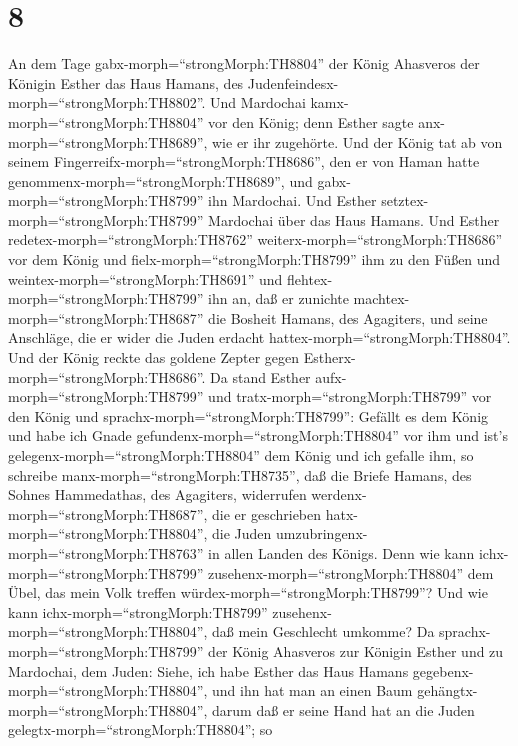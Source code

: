 \hypertarget{section-7}{%
\section{8}\label{section-7}}

 An dem Tage gabx-morph=``strongMorph:TH8804'' der König
Ahasveros der Königin Esther das Haus Hamans, des
Judenfeindesx-morph=``strongMorph:TH8802''. Und Mardochai
kamx-morph=``strongMorph:TH8804'' vor den König; denn Esther sagte
anx-morph=``strongMorph:TH8689'', wie er ihr zugehörte.  Und
der König tat ab von seinem Fingerreifx-morph=``strongMorph:TH8686'',
den er von Haman hatte genommenx-morph=``strongMorph:TH8689'', und
gabx-morph=``strongMorph:TH8799'' ihn Mardochai. Und Esther
setztex-morph=``strongMorph:TH8799'' Mardochai über das Haus Hamans.
 Und Esther redetex-morph=``strongMorph:TH8762''
weiterx-morph=``strongMorph:TH8686'' vor dem König und
fielx-morph=``strongMorph:TH8799'' ihm zu den Füßen und
weintex-morph=``strongMorph:TH8691'' und
flehtex-morph=``strongMorph:TH8799'' ihn an, daß er zunichte
machtex-morph=``strongMorph:TH8687'' die Bosheit Hamans, des Agagiters,
und seine Anschläge, die er wider die Juden erdacht
hattex-morph=``strongMorph:TH8804''.  Und der König reckte
das goldene Zepter gegen Estherx-morph=``strongMorph:TH8686''. Da stand
Esther aufx-morph=``strongMorph:TH8799'' und
tratx-morph=``strongMorph:TH8799'' vor den König  und
sprachx-morph=``strongMorph:TH8799'': Gefällt es dem König und habe ich
Gnade gefundenx-morph=``strongMorph:TH8804'' vor ihm und ist's
gelegenx-morph=``strongMorph:TH8804'' dem König und ich gefalle ihm, so
schreibe manx-morph=``strongMorph:TH8735'', daß die Briefe Hamans, des
Sohnes Hammedathas, des Agagiters, widerrufen
werdenx-morph=``strongMorph:TH8687'', die er geschrieben
hatx-morph=``strongMorph:TH8804'', die Juden
umzubringenx-morph=``strongMorph:TH8763'' in allen Landen des Königs.
 Denn wie kann ichx-morph=``strongMorph:TH8799''
zusehenx-morph=``strongMorph:TH8804'' dem Übel, das mein Volk treffen
würdex-morph=``strongMorph:TH8799''? Und wie kann
ichx-morph=``strongMorph:TH8799'' zusehenx-morph=``strongMorph:TH8804'',
daß mein Geschlecht umkomme?  Da
sprachx-morph=``strongMorph:TH8799'' der König Ahasveros zur Königin
Esther und zu Mardochai, dem Juden: Siehe, ich habe Esther das Haus
Hamans gegebenx-morph=``strongMorph:TH8804'', und ihn hat man an einen
Baum gehängtx-morph=``strongMorph:TH8804'', darum daß er seine Hand hat
an die Juden gelegtx-morph=``strongMorph:TH8804'';  so
